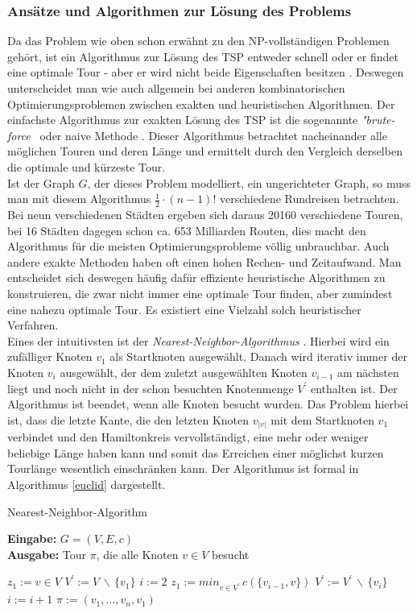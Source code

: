 \documentclass[doktyp=barbeit, sprache=german]{TUBAFarbeiten}
\begin{document}
\subsubsection{Ansätze und Algorithmen zur Lösung des Problems}
Da das Problem wie oben schon erwähnt zu den NP-vollständigen Problemen gehört, ist ein Algorithmus zur Lösung des TSP entweder schnell oder er findet eine optimale Tour - aber er wird nicht beide Eigenschaften besitzen \cite{TSP}. Deswegen unterscheidet man wie auch allgemein bei anderen kombinatorischen Optimierungsproblemen zwischen exakten und heuristischen Algorithmen.
Der einfachste Algorithmus zur exakten Lösung des TSP ist die sogenannte \textit{"brute-force\grqq} \, oder naive Methode \cite{TaschenbuchAlgorithmen}. Dieser Algorithmus betrachtet nacheinander alle möglichen Touren und deren Länge und ermittelt durch den Vergleich derselben die optimale und kürzeste Tour. 
\\Ist der Graph \(G\), der dieses Problem modelliert, ein ungerichteter Graph, so muss man mit diesem Algorithmus \(\frac{1}{2} \cdot (n - 1)!\) verschiedene Rundreisen betrachten. Bei neun verschiedenen Städten ergeben sich daraus 20160 verschiedene Touren, bei 16 Städten dagegen schon ca. 653 Milliarden Routen, dies macht den Algorithmus für die meisten Optimierungsprobleme völlig unbrauchbar. Auch andere exakte Methoden haben oft einen hohen Rechen- und Zeitaufwand. Man entscheidet sich deswegen häufig dafür effiziente heuristische Algorithmen zu konstruieren, die zwar nicht immer eine optimale Tour finden, aber zumindest eine nahezu optimale Tour. Es existiert eine Vielzahl solch heuristischer Verfahren.
\\Eines der intuitivsten ist der \textit{Nearest-Neighbor-Algorithmus} \cite{Lotz2014}. Hierbei wird ein zufälliger Knoten $v_1$ als Startknoten ausgewählt. Danach wird iterativ immer der Knoten $v_i$ ausgewählt, der dem zuletzt ausgewählten Knoten $v_{i-1}$ am nächsten liegt und noch nicht in der schon besuchten Knotenmenge $V^\prime$ enthalten ist. Der Algorithmus ist beendet, wenn alle Knoten besucht wurden. Das Problem hierbei ist, dass die letzte Kante, die den letzten Knoten $v_{|v|}$ mit dem Startknoten $v_1$ verbindet und den Hamiltonkreis vervollständigt, eine mehr oder weniger beliebige Länge haben kann und somit das Erreichen einer möglichst kurzen Tourlänge wesentlich einschränken kann. Der Algorithmus ist formal in Algorithmus \ref{euclid} dargestellt.
\begin{algorithm}
\caption{Nearest-Neighbor-Algorithm}
\label{euclid}
\textbf{Eingabe:} $G = (V,E,c)$
\\\textbf{Ausgabe:} Tour $\pi$, die alle Knoten $v \in V$ besucht
\begin{algorithmic}[1]
\State $z_1 := v \in V$
\State $V^\prime := V \, \backslash \, \{v_1\}$
\State $i := 2$
\State $z_1 := min_{v\in V^\prime}  \, c(\{v_{i-1},v\})$
\State $V^\prime := V^\prime \, \backslash \, \{v_i\}$
\State $i := i +1 $
\EndWhile
\State $\pi := (v_1,...,v_n,v_1)$
\end{algorithmic}
\end{algorithm}
\end{document}
